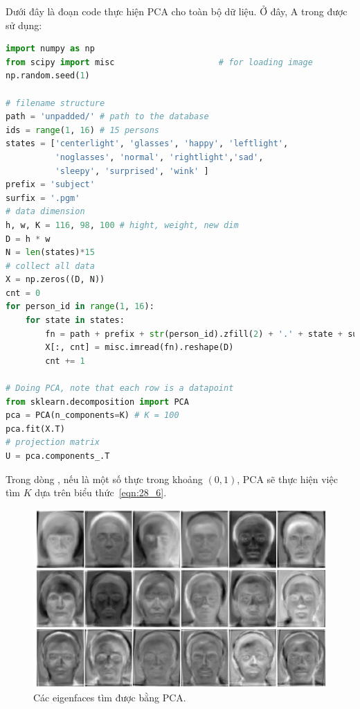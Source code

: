 Dưới đây là đoạn code thực hiện PCA cho toàn bộ dữ liệu. Ở đây, A trong  được sử dụng:
\newpage
\begin{lstlisting}[language=Python]
import numpy as np
from scipy import misc                     # for loading image
np.random.seed(1)

# filename structure
path = 'unpadded/' # path to the database
ids = range(1, 16) # 15 persons
states = ['centerlight', 'glasses', 'happy', 'leftlight',
          'noglasses', 'normal', 'rightlight','sad',
          'sleepy', 'surprised', 'wink' ]
prefix = 'subject'
surfix = '.pgm'
# data dimension
h, w, K = 116, 98, 100 # hight, weight, new dim
D = h * w
N = len(states)*15
# collect all data
X = np.zeros((D, N))
cnt = 0
for person_id in range(1, 16):
    for state in states:
        fn = path + prefix + str(person_id).zfill(2) + '.' + state + surfix
        X[:, cnt] = misc.imread(fn).reshape(D)
        cnt += 1

# Doing PCA, note that each row is a datapoint
from sklearn.decomposition import PCA
pca = PCA(n_components=K) # K = 100
pca.fit(X.T)
# projection matrix
U = pca.components_.T
\end{lstlisting}


Trong dòng , nếu
 là một số thực trong khoảng $(0, 1)$, PCA sẽ thực
hiện việc tìm $K$ dựa trên biểu thức~\eqref{eqn:28_6}.

\begin{figure}[t]
\centering
\includegraphics[width = \textwidth]{Chapters/07_DimemsionalityReduction/28_pca2/latex/yaleb_eig.pdf}
\caption[]{Các eigenfaces tìm được bằng PCA.}
\label{fig:28_2}
\end{figure}


